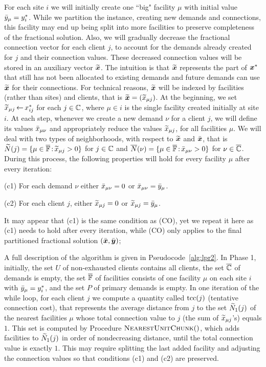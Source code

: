 \documentclass{llncs}
\begin{document}
For each site $i$ we will initially create one ``big" facility $\mu$
with initial value ${\bar y}_\mu = y^\ast_i$.  While we partition the
instance, creating new demands and connections, this facility may end
up being split into more facilities to preserve completeness of the
fractional solution. Also, we will gradually decrease the fractional
connection vector for each client $j$, to account for the demands
already created for $j$ and their connection values.  These decreased
connection values will be stored in an auxiliary vector
$\widetilde{\boldsymbol{x}}$. The intuition is that $\widetilde{\boldsymbol{x}}$ represents the part of
$\boldsymbol{x}^\ast$ that still has not been allocated to existing demands and
future demands can use $\widetilde{\boldsymbol{x}}$ for their connections. For
technical reasons, $\widetilde{\boldsymbol{x}}$ will be indexed by facilities (rather
than sites) and clients, that is $\widetilde{\boldsymbol{x}} = ({\widetilde x}_{\mu j})$.  At
the beginning, we set ${\widetilde x}_{\mu j}{\,\leftarrow\,} x_{ij}^\ast$ for each
$j\in\mathbb{C}$, where $\mu\in i$ is the single facility created
initially at site $i$.  At each step, whenever we create a new demand
$\nu$ for a client $j$, we will define its values ${\bar x}_{\mu\nu}$ and
appropriately reduce the values ${\widetilde x}_{\mu j}$, for all facilities
$\mu$. We will deal with two types of neighborhoods, with respect to
$\widetilde{\boldsymbol{x}}$ and $\bar{\boldsymbol{x}}$, that is ${\widetilde N}(j)=\{\mu\in\overline{\mathbb{F}}
{\,:\,}{\widetilde x}_{\mu j} > 0\}$ for $j\in\mathbb{C}$ and
${\overline{N}}(\nu)=\{\mu\in\overline{\mathbb{F}} {\,:\,} {\bar x}_{\mu\nu} >0\}$ for
$\nu\in\overline{\mathbb{C}}$.  During this process, the following properties
will hold for every facility $\mu$ after every iteration: 
\begin{description}
\item (c1) For each demand $\nu$ either ${\bar x}_{\mu\nu}=0$ or
  ${\bar x}_{\mu\nu}={\bar y}_{\mu}$.
\item (c2) For each client $j$, either ${\widetilde x}_{\mu j}=0$ or
  ${\widetilde x}_{\mu j}={\bar y}_{\mu}$.
\end{description}
It may appear that (c1) is the same condition as (CO), yet we repeat
it here as (c1) needs to hold after every iteration, while (CO) only
applies to the final partitioned fractional solution $(\bar{\boldsymbol{x}},
\bar{\boldsymbol{y}})$;

A full description of the algorithm is given in
Pseudocode~\ref{alg:lpr2}. In Phase 1, initially, the set $U$ of
non-exhausted clients contains all clients, the set $\overline{\mathbb{C}}$ of
demands is empty, the set $\overline{\mathbb{F}}$ of facilities consists of one
facility $\mu$ on each site $i$ with ${\bar y}_\mu = y^\ast_i$, and the
set $P$ of primary demands is empty.  In one iteration of the while
loop, for each client $j$ we compute a quantity called $\textrm{tcc}(j)$
(tentative connection cost), that represents the average distance from
$j$ to the set ${\widetilde N}_1(j)$ of the nearest facilities $\mu$ whose
total connection value to $j$ (the sum of ${\widetilde x}_{\mu j}$'s) equals
$1$.  This set is computed by Procedure ${\textsc{NearestUnitChunk}}()$, which
adds facilities to ${\widetilde N}_1(j)$ in order of nondecreasing distance,
until the total connection value is exactly $1$. This may require
splitting the last added facility and adjusting the connection values
so that conditions (c1) and (c2) are preserved.
\end{document}
